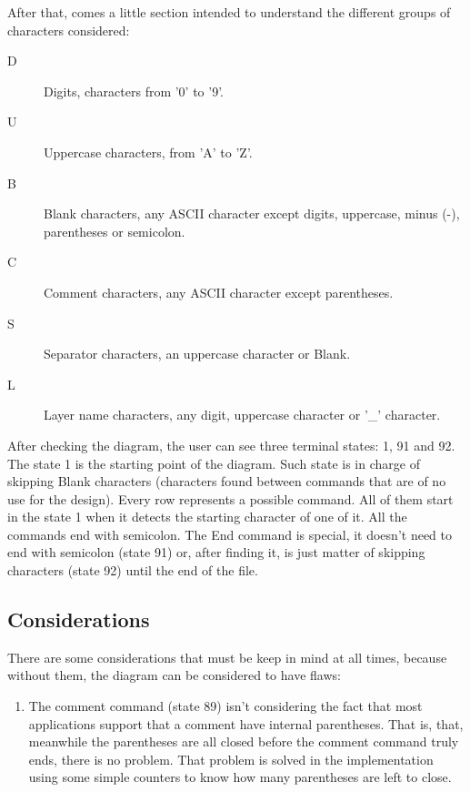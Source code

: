 \documentclass[11pt,twoside,openany,x11names,svgnames]{memoir}
\begin{document}
After that, comes a little section intended to understand the different groups of characters considered:

\begin{description}
\item[D]	Digits, characters from '0' to '9'.
\item[U]	Uppercase characters, from 'A' to 'Z'.
\item[B]	Blank characters, any ASCII character except digits, uppercase, minus (-), parentheses or semicolon.
\item[C]	Comment characters, any ASCII character except parentheses.
\item[S]	Separator characters, an uppercase character or Blank.
\item[L]	Layer name characters, any digit, uppercase character or '\_' character.
\end{description}

After checking the diagram, the user can see three terminal states: 1, 91 and 92. The state 1 is the starting point of the diagram. Such state is in charge of skipping Blank characters (characters found between commands that are of no use for the design). Every row represents a possible command. All of them start in the state 1 when it detects the starting character of one of it. All the commands end with semicolon. The End command is special, it doesn't need to end with semicolon (state 91) or, after finding it, is just matter of skipping characters (state 92) until the end of the file.

\subsection{Considerations}\label{Considerations}

There are some considerations that must be keep in mind at all times, because without them, the diagram can be considered to have flaws:

\begin{enumerate}
\item The comment command (state 89) isn't considering the fact that most applications support that a comment have internal parentheses. That is, that, meanwhile the parentheses are all closed before the comment command truly ends, there is no problem. That problem is solved in the implementation using some simple counters to know how many parentheses are left to close.
\end{enumerate}
\end{document}

